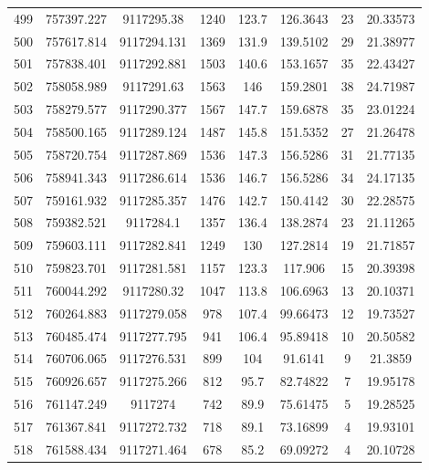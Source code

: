 \begin{longtable}{cccccccc}
499  & 757397.227      & 9117295.38       & 1240    & 123.7 & 126.3643 & 23 & 20.33573 \\
500  & 757617.814      & 9117294.131      & 1369    & 131.9 & 139.5102 & 29 & 21.38977 \\
501  & 757838.401      & 9117292.881      & 1503    & 140.6 & 153.1657 & 35 & 22.43427 \\
502  & 758058.989      & 9117291.63       & 1563    & 146   & 159.2801 & 38 & 24.71987 \\
503  & 758279.577      & 9117290.377      & 1567    & 147.7 & 159.6878 & 35 & 23.01224 \\
504  & 758500.165      & 9117289.124      & 1487    & 145.8 & 151.5352 & 27 & 21.26478 \\
505  & 758720.754      & 9117287.869      & 1536    & 147.3 & 156.5286 & 31 & 21.77135 \\
506  & 758941.343      & 9117286.614      & 1536    & 146.7 & 156.5286 & 34 & 24.17135 \\
507  & 759161.932      & 9117285.357      & 1476    & 142.7 & 150.4142 & 30 & 22.28575 \\
508  & 759382.521      & 9117284.1        & 1357    & 136.4 & 138.2874 & 23 & 21.11265 \\
509  & 759603.111      & 9117282.841      & 1249    & 130   & 127.2814 & 19 & 21.71857 \\
510  & 759823.701      & 9117281.581      & 1157    & 123.3 & 117.906  & 15 & 20.39398 \\
511  & 760044.292      & 9117280.32       & 1047    & 113.8 & 106.6963 & 13 & 20.10371 \\
512  & 760264.883      & 9117279.058      & 978     & 107.4 & 99.66473 & 12 & 19.73527 \\
513  & 760485.474      & 9117277.795      & 941     & 106.4 & 95.89418 & 10 & 20.50582 \\
514  & 760706.065      & 9117276.531      & 899     & 104   & 91.6141  & 9  & 21.3859  \\
515  & 760926.657      & 9117275.266      & 812     & 95.7  & 82.74822 & 7  & 19.95178 \\
516  & 761147.249      & 9117274          & 742     & 89.9  & 75.61475 & 5  & 19.28525 \\
517  & 761367.841      & 9117272.732      & 718     & 89.1  & 73.16899 & 4  & 19.93101 \\
518  & 761588.434      & 9117271.464      & 678     & 85.2  & 69.09272 & 4  & 20.10728 \\

\end{longtable}
